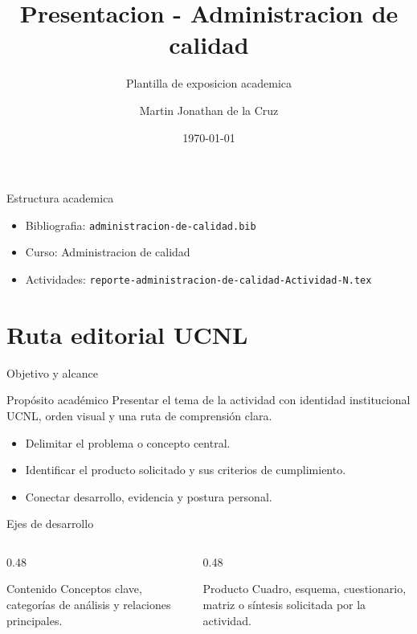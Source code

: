 ﻿\documentclass[spanish,aspectratio=169]{beamer}
\title{Presentacion - Administracion de calidad}
\subtitle{Plantilla de exposicion academica}
\author{Martin Jonathan de la Cruz}
\institute{Universidad Ciudadana de Nuevo Leon}
\date{\today}
\begin{document}
\begin{frame}
  \titlepage
\end{frame}

\begin{frame}{Estructura academica}
  \begin{itemize}
    \item Bibliografia: \texttt{administracion-de-calidad.bib}
    \item Curso: Administracion de calidad
    \item Actividades: \texttt{reporte-administracion-de-calidad-Actividad-N.tex}
  \end{itemize}
\end{frame}


\section{Ruta editorial UCNL}

\begin{frame}{Objetivo y alcance}
  \begin{block}{Propósito académico}
    Presentar el tema de la actividad con identidad institucional UCNL, orden visual y una ruta de comprensión clara.
  \end{block}
  \begin{itemize}
    \item Delimitar el problema o concepto central.
    \item Identificar el producto solicitado y sus criterios de cumplimiento.
    \item Conectar desarrollo, evidencia y postura personal.
  \end{itemize}
\end{frame}

\begin{frame}{Ejes de desarrollo}
  \begin{columns}[T,totalwidth=\textwidth]
    \begin{column}{0.48\textwidth}
      \begin{block}{Contenido}
        Conceptos clave, categorías de análisis y relaciones principales.
      \end{block}
    \end{column}
    \begin{column}{0.48\textwidth}
      \begin{block}{Producto}
        Cuadro, esquema, cuestionario, matriz o síntesis solicitada por la actividad.
      \end{block}
    \end{column}
  \end{columns}
\end{frame}
\end{document}
